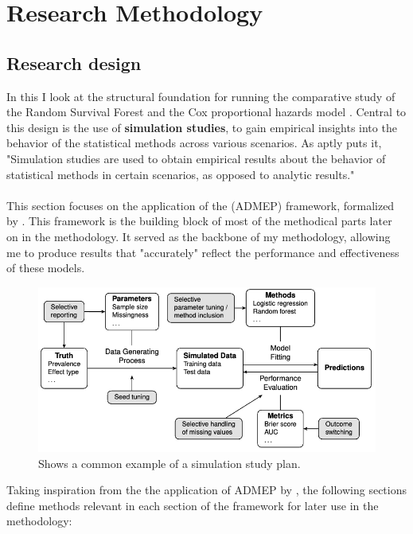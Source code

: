 \chapter{Research Methodology}
\label{Chapter2} %

\section{Research design} \label{design}

\noindent In this I look at the structural foundation for running the comparative study of the Random Survival Forest \parencite{ishwaran_random_2008} and the Cox proportional hazards model \parencite{cox_regression_1972}. Central to this design is the use of \textbf{simulation studies}, to gain empirical insights into the behavior of the statistical methods across various scenarios. As \parencite{morris_using_2019} aptly puts it, "Simulation studies are used to obtain empirical results about the behavior of statistical methods in certain scenarios, as opposed to analytic results."
\\\\
\noindent This section focuses on the application of the (ADMEP) framework, formalized by \parencite{morris_using_2019}. This framework is the building block of most of the methodical parts later on in the methodology. It served as the backbone of my methodology, allowing me to produce results that "accurately" reflect the performance and effectiveness of these models.

\begin{figure}[h]
 \centering
 \includegraphics[scale=0.25]{Figures/METHOD_GRAPH.png}
 \caption{\parencite{pawel_pitfalls_2024} Shows a common example of a simulation study plan.}
\end{figure}

\noindent Taking inspiration from the the application of ADMEP by \parencite{pawel_pitfalls_2024}, the following sections define methods relevant in each section of the framework for later use in the methodology:

